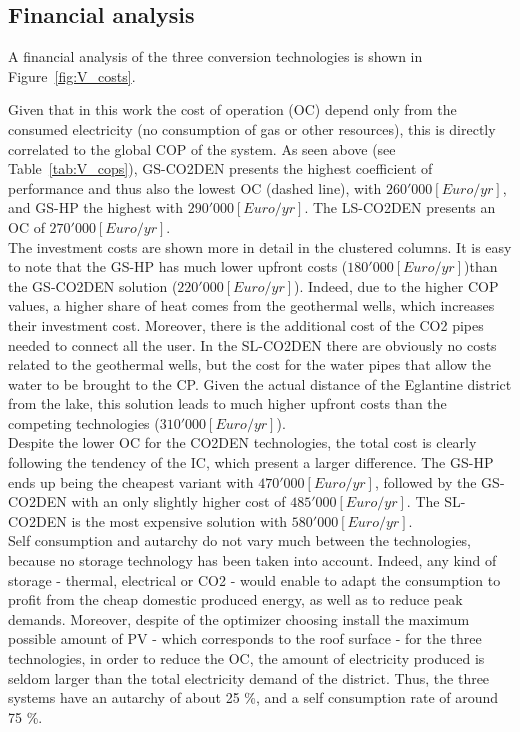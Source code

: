 \documentclass{article}
\begin{document}
\subsection{Financial analysis}

A financial analysis of the three conversion technologies is shown in Figure~\ref{fig:V_costs}. 

Given that in this work the cost of operation (OC) depend only from the consumed electricity (no consumption of gas or other resources), this is directly correlated to the global COP of the system. As seen above (see Table~\ref{tab:V_cops}), GS-CO2DEN presents the highest coefficient of performance and thus also the lowest OC (dashed line), with $260'000[Euro/yr]$, and GS-HP the highest with $290'000[Euro/yr]$. The LS-CO2DEN presents an OC of $270'000[Euro/yr]$.\\

The investment costs are shown more in detail in the clustered columns. It is easy to note that the GS-HP has much lower upfront costs ($180'000[Euro/yr]$)than the GS-CO2DEN solution ($220'000[Euro/yr]$). Indeed, due to the higher COP values, a higher share of heat comes from the geothermal wells, which increases their investment cost. Moreover, there is the additional cost of the CO2 pipes needed to connect all the user. In the SL-CO2DEN there are obviously no costs related to the geothermal wells, but the cost for the water pipes that allow the water to be brought to the CP. Given the actual distance of the Eglantine district from the lake, this solution leads to much higher upfront costs than the competing technologies ($310'000[Euro/yr]$).\\

Despite the lower OC for the CO2DEN technologies, the total cost is clearly following the tendency of the IC, which present a larger difference. The GS-HP ends up being the cheapest variant with $470'000 [Euro/yr]$, followed by the GS-CO2DEN with an only slightly higher cost of $485'000 [Euro/yr]$. The SL-CO2DEN is the most expensive solution with $580'000 [Euro/yr]$.\\

Self consumption and autarchy do not vary much between the technologies, because no storage technology has been taken into account. Indeed, any kind of storage - thermal, electrical or CO2 - would enable to adapt the consumption to profit from the cheap domestic produced energy, as well as to reduce peak demands. Moreover, despite of the optimizer choosing install the maximum possible amount of PV - which corresponds to the roof surface - for the three technologies, in order to reduce the OC, the amount of electricity produced is seldom larger than the total electricity demand of the district. Thus, the three systems have an autarchy of about 25 \%, and a self consumption rate of around 75 \%.\\
\end{document}
